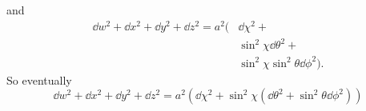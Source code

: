 %
and
%
\begin{align*}
    \dd w^2 + \dd x^2 + \dd y^2 + \dd z^2 = a^2( & \dd \chi^2 +                           \\
                                                 & \sin^2 \chi \dd \theta^2 +             \\
                                                 & \sin^2 \chi \sin^2 \theta \dd \phi^2).
\end{align*}
%
So eventually
%
\begin{equation}
    \boxed{\dd w^2 + \dd x^2 + \dd y^2 + \dd z^2 =
        a^2\left( \dd \chi^2 +
        \sin^2 \chi \left(\dd \theta^2 +
        \sin^2 \theta \dd \phi^2\right)\right)}
\end{equation}